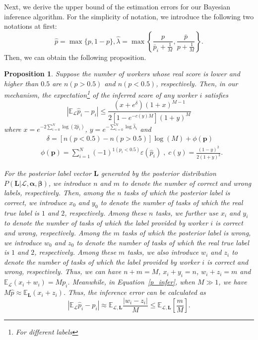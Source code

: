 \documentclass{article}
\makeatletter
\newtheorem{proposition}[theorem]{Proposition}
\renewenvironment{proof}[1][\proofname]{\par
  \vspace{-\topsep}%
  \pushQED{\qed}%
  \normalfont
  \topsep0pt \partopsep0pt %
  \trivlist
  \item[\hskip\labelsep
        \itshape
    #1\@addpunct{.}]\ignorespaces
}{%
  \popQED\endtrivlist\@endpefalse
  \addvspace{0pt plus 0pt} %
}
\makeatother
\begin{document}
Next, we derive the upper bound of the estimation errors for our Bayesian inference algorithm.
For the simplicity of notation, we introduce the following two notations at first:
\begin{equation}
\hat{p}=\max\{p, 1-p\},\hat{\lambda}=\max\left\{\frac{p}{\bar{p}_i+\frac{1}{M}}, \frac{\bar{p}}{p+\frac{1}{M}}\right\}.
\end{equation}
Then, we can obtain the following proposition.
\begin{proposition}
\label{ConvBound}
Suppose the number of workers whose real score is lower and higher than $0.5$ are $n(p>0.5)$ and $n(p<0.5)$, respectively.
Then, in our mechanism, the expectation\footnote{For different labels} of the inferred score of any worker $i$ satisfies
\begin{equation*}
|\mathbb{E}_{\mathcal{L}}\hat{p}_i-p_i|\leq \frac{(x+e^{\delta})(1+x)^{M-1}}{2[1-e^{-c(y)M}](1+y)^{M}}
\end{equation*}
where $x=e^{-2{\sum}_{i=0}^{N}\log \left(2\hat{p}_i\right)}$, $y=e^{-{\sum}_{i=0}^{N}\log \hat{\lambda}_{i}}$ and
\begin{equation*}
\begin{split}
&\;\;\;\delta = [n(p<0.5)-n(p>0.5)]\log(M)+\phi(\bm{p})\\
&\phi(\bm{p})=\sum_{i=1}^{N}(-1)^{1(p_i<0.5)}\varepsilon(\hat{p}_i)\;,\; c(y)=\frac{(1-y)^2}{2(1+y)^{2}}.
\end{split}
\end{equation*}
\begin{proof}
For the posterior label vector $\bm{L}$ generated by the posterior distribution $P(\bm{L}|\mathcal{L},\bm{\alpha}, \bm{\beta})$, we introduce $n$ and $m$ to denote the number of correct and wrong labels, respectively.
Then, among the $n$ tasks of which the posterior label is correct, we introduce $x_0$ and $y_0$ to denote the number of tasks of which the real true label is $1$ and $2$, respectively.
Among these $n$ tasks, we further use $x_i$ and $y_i$ to denote the number of tasks of which the label provided by worker $i$ is correct and wrong, respectively.
Among the $m$ tasks of which the posterior label is wrong, we introduce $w_0$ and $z_0$ to denote the number of tasks of which the real true label is $1$ and $2$, respectively.
Among these $m$ tasks, we also introduce $w_i$ and $z_i$ to denote the number of tasks of which the label provided by worker $i$ is correct and wrong, respectively.
Thus, we can have $n+m=M$, $x_i+y_i=n$, $w_i+z_i=m$ and $\mathbb{E}_{\mathcal{L}}(x_i+w_i)=Mp_i$.
Meanwhile, in Equation~\ref{p_infer}, when $M\gg 1$, we have $M\hat{p} \approx \mathbb{E}_{\bm{L}}(x_i+z_i)$.
Thus, the inference error can be calculated as
\begin{equation}
\label{ErrorBound}
 |\mathbb{E}_{\mathcal{L}}\hat{p}_i-p_i|\approx \mathbb{E}_{\mathcal{L},\bm{L}}\frac{|w_i-z_i|}{M}
 \leq \mathbb{E}_{\mathcal{L},\bm{L}}\left[\frac{m}{M}\right].
\end{equation}


\end{proof}
\end{proposition}
\end{document}
